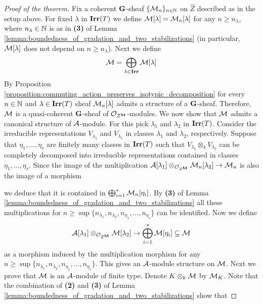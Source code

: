 \begin{proof}[Proof of the theorem]
Fix a coherent $\mathbf{G}$-sheaf $\{{\mathcal M}_n\}_{n\in {\mathbb N}}$ on $\widehat{Z}$ described as in the setup above. For fixed $\lambda$ in $\mathbf{Irr}(T)$ we define ${\mathcal M}[\lambda] = {\mathcal M}_n[\lambda]$ for any $n\geq n_{\lambda}$, where $n_{\lambda}\in {\mathbb N}$ is as in \textbf{(3)} of Lemma \ref{lemma:boundedness_of_gradation_and_two_stabilizations} (in particular, ${\mathcal M}[\lambda]$ does not depend on $n\geq n_{\lambda}$). Next we define
$${\mathcal M} = \bigoplus_{\lambda\in \mathbf{Irr}}{\mathcal M}[\lambda]$$
By Proposition \ref{proposition:commuting_action_preserves_isotypic_decomposition} for every $n\in {\mathbb N}$ and $\lambda \in \mathbf{Irr}(T)$ sheaf ${\mathcal M}_n[\lambda]$ admits a structure of a $\mathbf{G}$-sheaf. Therefore, ${\mathcal M}$ is a quasi-coherent $\mathbf{G}$-sheaf of ${\mathcal O}_{Z^{\mathbf{M}}}$-modules. We now show that ${\mathcal M}$ admits a canonical structure of ${\mathcal A}$-module. For this pick $\lambda_1$ and $\lambda_2$ in $\mathbf{Irr}(T)$. Consider the irreducible representations $V_{\lambda_1}$ and $V_{\lambda_1}$ in classes $\lambda_1$ and $\lambda_2$, respectively. Suppose that $\eta_1,...,\eta_s$ are finitely many classes in $\mathbf{Irr}(T)$ such that $V_{\lambda_1}\otimes_k V_{\lambda_2}$ can be completely decomposed into irreducible representations contained in classes $\eta_1,...,\eta_s$. Since the image of the multiplication ${\mathcal A}[\lambda_1]\otimes_{{\mathcal O}_{Z^{\mathbf{M}}}}{\mathcal M}_n[\lambda_2]\rightarrow {\mathcal M}_n$ is also the image of a morphism
\begin{center}
\end{center}
we deduce that it is contained in $\bigoplus_{i=1}^s{\mathcal M}_n[\eta_i]$. By \textbf{(3)} of Lemma \ref{lemma:boundedness_of_gradation_and_two_stabilizations} all these multiplications for $n\geq \sup \{n_{\lambda_1},n_{\lambda_2},n_{\eta_1},...,n_{\eta_s}\}$ can be identified. Now we define
$${\mathcal A}[\lambda_1]\otimes_{{\mathcal O}_{Z^{\mathbf{M}}}} {\mathcal M}[\lambda_2]\rightarrow  \bigoplus_{i=1}^s{\mathcal M}[\eta_i]\subseteq {\mathcal M}$$
as a morphism induced by the multiplication morphism for any $n\geq \sup\{n_{\lambda_1},n_{\lambda_2},n_{\eta_1},...,n_{\eta_s}\}$. This gives an ${\mathcal A}$-module structure on ${\mathcal M}$. Next we prove that ${\mathcal M}$ is an ${\mathcal A}$-module of finite type. Denote $K\otimes_k{\mathcal M}$ by ${\mathcal M}_K$. Note that the combination of \textbf{(2)} and \textbf{(3)} of Lemma \ref{lemma:boundedness_of_gradation_and_two_stabilizations} show that

\end{proof}
